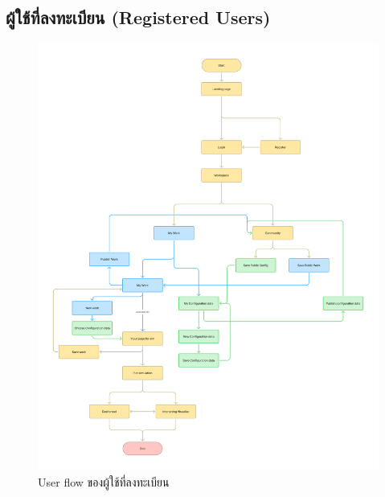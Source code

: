   \subsection{ผู้ใช้ที่ลงทะเบียน (Registered Users)}
    \begin{figure}[H]
      \centering
      \includegraphics[width=\textwidth,height=0.9\textheight,keepaspectratio]{User_flow_-_login.png}
      \caption{User flow ของผู้ใช้ที่ลงทะเบียน}
      \label{fig:UserFlowRegistered}
    \end{figure}
      
\newpage
